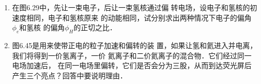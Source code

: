 \begin{enumerate}
\item 在图6.29中，先让一束电子，后让一束氢核通过偏
转电场，设电子和氢核的初速度相同，电子和氢核原来
的动能相同，试分别求出两种情况下电子的偏角$\phi_e$和氢核
的偏角$\phi_H$的正切之比．

\begin{figure}[htp]\centering
	\caption{}
	\end{figure}
	
\item 图6.45是用来使带正电的粒子加速和偏转的装
置，如果让氢和氦进入并电离，我们将得到一价氢离子，一价
氦离子和二价氦离子的混合物．它们经过同一电场加速后，
在同一电场里偏转，它们是否会分为三股，从而到达荧光屏后
产生三个亮点？回答中要说明理由．

\end{enumerate}

















